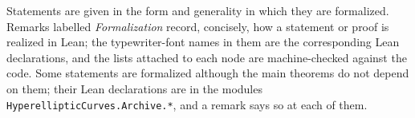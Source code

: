 Statements are given in the form and generality in which they are formalized. Remarks
labelled \emph{Formalization} record, concisely, how a statement or proof is realized in
Lean; the typewriter-font names in them are the corresponding Lean declarations, and the
lists attached to each node are machine-checked against the code. Some statements are
formalized although the main theorems do not depend on them; their Lean declarations are in
the modules \texttt{HyperellipticCurves.Archive.*}, and a remark says so at each of them.








